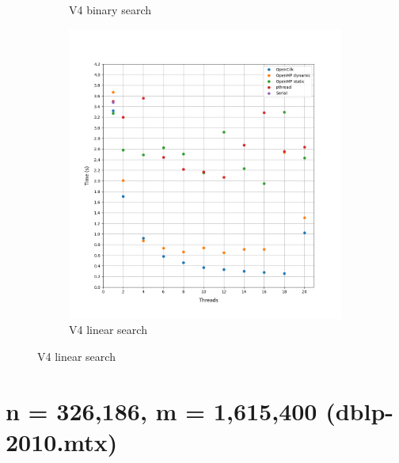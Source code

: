 \documentclass[12pt, a4paper]{article}
\begin{document}
\begin{figure}[h!]
\begin{subfigure}[b]{0.33\textwidth}
         \caption{V4 binary search}
     \end{subfigure}
     \begin{subfigure}[b]{0.33\textwidth}
         \centering
         \includegraphics[height=.4\textheight, width=\textwidth, keepaspectratio]{assets/youtube/v4_linear.png}
         \caption{V4 linear search} 
     \end{subfigure}
\end{figure}

\section{n = 326,186, m = 1,615,400 (dblp-2010.mtx)}
\end{document}

